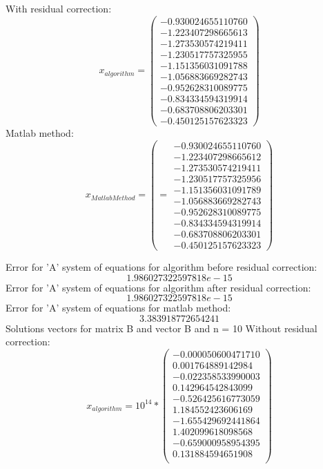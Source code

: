 \documentclass[12pt]{report}
\begin{document}
With residual correction:
\[ x_{algorithm} = \left(\begin{array}{cc}
-0.930024655110760 \\
-1.223407298665613 \\
-1.273530574219411 \\
-1.230517757325955 \\
-1.151356031091788 \\
-1.056883669282743 \\
-0.952628310089775 \\
-0.834334594319914 \\
-0.683708806203301 \\
-0.450125157623323
\end{array} \right)
\]
Matlab method:
\[
x_{Matlab Method} = \left(  = \begin{array}{cc}
-0.930024655110760 \\
-1.223407298665612 \\
-1.273530574219411 \\
-1.230517757325956 \\
-1.151356031091789 \\
-1.056883669282743 \\
-0.952628310089775 \\
-0.834334594319914 \\
-0.683708806203301 \\
-0.450125157623323
\end{array} \right)
\]

Error for 'A' system of equations for algorithm before residual correction: \[ 1.986027322597818e-15 \]
Error for 'A' system of equations for algorithm after residual correction: \[ 1.986027322597818e-15 \]
Error for 'A' system of equations for matlab method: \[ 3.383918772654241 \]
\newpage
Solutions vectors for matrix B and vector B and n = 10
Without residual correction:
\[ x_{algorithm} = 10^{14} * \left(\begin{array}{cc}
-0.000050600471710 \\
 0.001764889142984 \\
-0.022358533990003 \\
 0.142964542843099 \\
-0.526425616773059 \\
 1.184552423606169 \\
-1.655429692441864 \\
 1.402099618098568 \\
-0.659000958954395 \\
 0.131884594651908 \\
\end{array} \right)
\]
\end{document}
